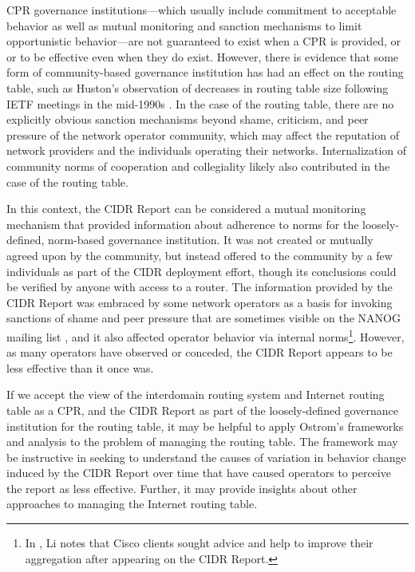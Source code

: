 CPR governance institutions---which usually include commitment to acceptable behavior as well as mutual monitoring and sanction mechanisms to limit opportunistic behavior---are not guaranteed to exist when a CPR is provided, or or to be effective even when they do exist. However, there is evidence that some form of community-based governance institution has had an effect on the routing table, such as Huston's observation of decreases in routing table size following IETF meetings in the mid-1990s \cite{Huston:2001bs,Clayton:2010bh}. In the case of the routing table, there are no explicitly obvious sanction mechanisms beyond shame, criticism, and peer pressure of the network operator community, which may affect the reputation of network providers and the individuals operating their networks. Internalization of community norms of cooperation and collegiality \cite{Abbate:2000ve} likely also contributed in the case of the routing table.

In this context, the CIDR Report can be considered a mutual monitoring mechanism that provided information about adherence to norms for the loosely-defined, norm-based governance institution. It was not created or mutually agreed upon by the community, but instead offered to the community by a few individuals as part of the CIDR deployment effort, though its conclusions could be verified by anyone with access to a router. The information provided by the CIDR Report was embraced by some network operators as a basis for invoking sanctions of shame and peer pressure that are sometimes visible on the NANOG mailing list \cite{NANOG}, and it also affected operator behavior via internal norms\footnote{In \cite{Li:2011vn}, Li notes that Cisco clients sought advice and help to improve their aggregation after appearing on the CIDR Report.}. However, as many operators have observed or conceded, the CIDR Report appears to be less effective than it once was.

If we accept the view of the interdomain routing system and Internet routing table as a CPR, and the CIDR Report as part of the loosely-defined governance institution for the routing table, it may be helpful to apply Ostrom's frameworks and analysis to the problem of managing the routing table. The framework may be instructive in seeking to understand the causes of variation in behavior change induced by the CIDR Report over time that have caused operators to perceive the report as less effective. Further, it may provide insights about other approaches to managing the Internet routing table.

